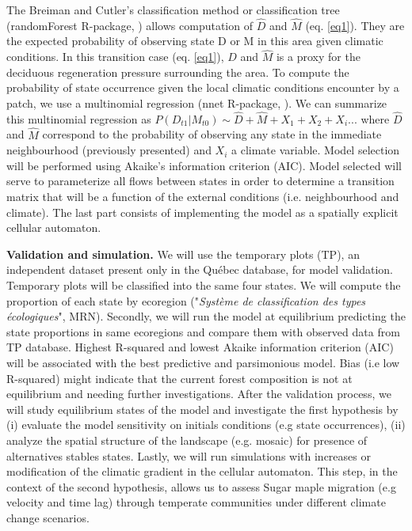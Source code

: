 The Breiman and Cutler's classification method or classification tree
(randomForest R-package, \cite{Liaw2002a}) allows computation of $\hat{D}$ and
$\hat{M}$ (eq. \ref{eq1}). They are the expected probability of observing
state D or M in this area given climatic conditions. In this transition case
(eq. \ref{eq1}), $\hat{D}$ and $\hat{M}$ is a proxy for the deciduous
regeneration pressure surrounding the area. To compute the probability of
state occurrence given the local climatic conditions encounter by a patch, we
use a multinomial regression (nnet R-package, \cite{Venables2002}). We can
summarize this multinomial regression as $P(D_{t1}|M_{t0}) \sim \hat{D} +
\hat{M} + X_1+X_2+X_i... $ where $\hat{D}$ and $\hat{M}$ correspond to the
probability of observing any state in the immediate neighbourhood (previously
presented) and $X_i$ a climate variable. Model selection will be performed using
Akaike's information criterion (AIC). Model selected will serve to parameterize
all flows between states in order to determine a transition matrix that will
be a function of the external conditions (i.e. neighbourhood and climate). 
The last part consists of implementing the model as a spatially explicit cellular
automaton. 



\textbf{Validation and simulation.} We will use the temporary plots (TP), an
independent  dataset present only in the Québec database, for model
validation. Temporary plots will be classified into the same four states. We
will compute the proportion of each state by ecoregion ("\textit{Système de
classification des types écologiques}", MRN). Secondly, we will run the model
at equilibrium predicting the state proportions in same ecoregions and compare
them with observed data from TP database. Highest R-squared and lowest Akaike
information criterion (AIC) will be associated with the best predictive and
parsimonious model. Bias (i.e low R-squared) might indicate that the current
forest composition is not at equilibrium and needing further investigations.
After the validation process, we will study equilibrium states of the model
and investigate the first hypothesis by (i) evaluate the model sensitivity on
initials conditions (e.g state occurrences), (ii) analyze the spatial
structure of the landscape (e.g. mosaic) for presence of alternatives stables
states. Lastly, we will run simulations with increases or modification of the
climatic gradient in the cellular automaton. This step, in the context of the
second hypothesis, allows us to assess Sugar maple migration (e.g velocity and
time lag) through  temperate communities under different climate change
scenarios.


\clearpage
\small

